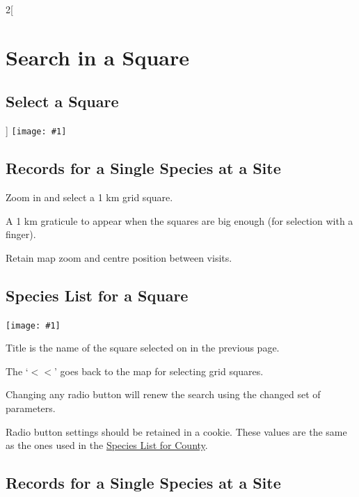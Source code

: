 \documentclass[a4paper,12pt,landscape]{article}
\newcommand{\wireframe}[1]{\texttt{[image: \#1]}\clearpage}
\begin{document}
\begin{multicols*}{2}[%
  \section{Search in a Square}%
  \subsection{Select a Square}%
]
\thispagestyle{empty}
\wireframe{./wireframes/Squares__Index.png}%

\subsection{Records for a Single Species at a Site}

\begin{todolist}
  \item Zoom in and select a 1 km grid square.
  \item A 1 km graticule to appear when the squares are big enough (for selection with a finger).
  \item Retain map zoom and centre position between visits.
\end{todolist}

\clearpage

\subsection{Species List for a Square}

\wireframe{./wireframes/Species__ListForSquare.png}%

\begin{todolist}
  \item Title is the name of the square selected on in the previous page.
  \item The `$<<$' goes back to the map for selecting grid squares.
  \item Changing any radio button will renew the search using the changed set of parameters.
  \item Radio button settings should be retained in a cookie.
    These values are the same as the ones used in the \hyperref[sec:species-list-for-county]{Species List for County}.
\end{todolist}

\clearpage

\subsection{Records for a Single Species at a Site}


\end{multicols*}
\end{document}
